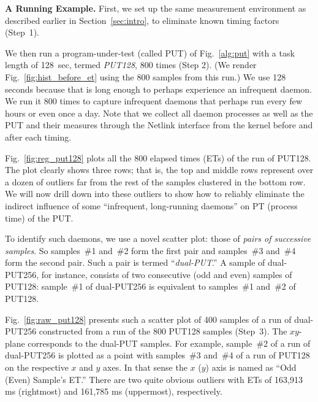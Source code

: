 \documentclass[letter]{ieice}
\begin{document}
{\bf A Running Example.} 
{\color{blue}
First, we set up the same measurement environment as described earlier in \hbox{Section}~\ref{sec:intro}, 
to eliminate known timing factors (Step~1).
}

We then run a program-under-test (called PUT) of 
Fig.~\ref{alg:put} with a task length of 128~sec, 
termed {\em PUT128}, 800 times (Step 2). 
(We render Fig.~\ref{fig:hist_before_et} using the 800 samples from this run.)
We use 128 seconds because that is long enough to perhaps experience an infrequent daemon. 
We run it 800 times to capture infrequent daemons that perhaps run every few hours or even 
once a day. 
Note that we collect all daemon processes as well as the PUT and their measures 
through the Netlink interface from the kernel before and after each 
timing.

Fig.~\ref{fig:reg_put128} plots all the 800 elapsed times (ETs) of the run of PUT128.
The plot clearly shows three rows; that is, 
the top and middle rows represent over a dozen of outliers far from 
the rest of the samples clustered in the bottom row. 
We will now drill down into these outliers to 
show how to reliably eliminate the indirect influence of 
some ``infrequent, \hbox{long-running} daemons'' on PT (\hbox{process} time) of the PUT.

{\color{blue}
To identify such daemons, we use a novel \hbox{scatter} plot: 
those of {\em pairs of successive samples}. 
So samples~\#{1} and~\#{2} form the first pair and samples~\#{3} and~\#{4} 
form the second pair.
Such a pair is termed ``\hbox{{\it dual-PUT}}.'' 
A sample of \hbox{dual-PUT256}, for instance, 
consists of two consecutive (odd and even) 
samples of PUT128: 
sample~\#{1} of dual-PUT256 is equivalent 
to samples~\#{1} and~\#{2} of PUT128.
}

Fig.~\ref{fig:raw_put128} presents such a scatter plot 
of 400 samples of a run of \hbox{dual-PUT256} constructed 
from a run of the 800 PUT128 samples (Step~3). 
{\color{blue}
The $xy$-plane corresponds to the dual-PUT samples. 
For example, \hbox{sample}~\#{2} of a run of dual-PUT256 
is plotted as a point with samples~\#{3} and~\#{4} of a run of PUT128 
on the respective $x$ and $y$ axes. In that sense 
the $x$ ($y$) axis is named as ``Odd (Even) Sample's ET.''
}
There are two quite obvious outliers with ETs 
of 163,913 ms (rightmost) and 161,785 ms (uppermost), respectively.
\end{document}
